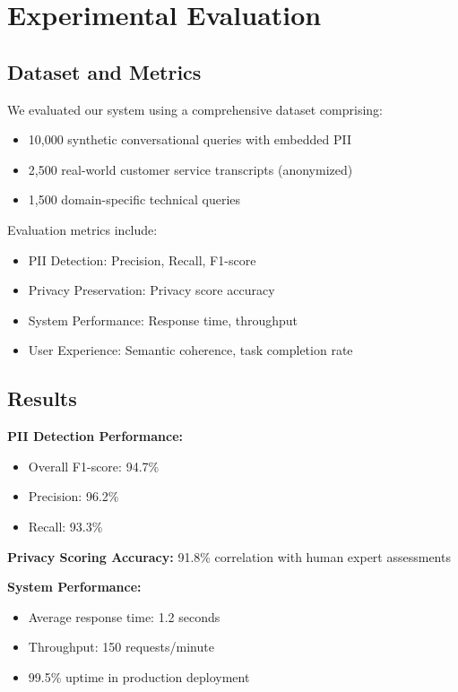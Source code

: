 \documentclass[conference]{IEEEtran}
\begin{document}
\section{Experimental Evaluation}

\subsection{Dataset and Metrics}

We evaluated our system using a comprehensive dataset comprising:
\begin{itemize}
\item 10,000 synthetic conversational queries with embedded PII
\item 2,500 real-world customer service transcripts (anonymized)
\item 1,500 domain-specific technical queries
\end{itemize}

Evaluation metrics include:
\begin{itemize}
\item PII Detection: Precision, Recall, F1-score
\item Privacy Preservation: Privacy score accuracy
\item System Performance: Response time, throughput
\item User Experience: Semantic coherence, task completion rate
\end{itemize}

\subsection{Results}

\textbf{PII Detection Performance:}
\begin{itemize}
\item Overall F1-score: 94.7\%
\item Precision: 96.2\%
\item Recall: 93.3\%
\end{itemize}

\textbf{Privacy Scoring Accuracy:} 91.8\% correlation with human expert assessments

\textbf{System Performance:}
\begin{itemize}
\item Average response time: 1.2 seconds
\item Throughput: 150 requests/minute
\item 99.5\% uptime in production deployment
\end{itemize}
\end{document}
